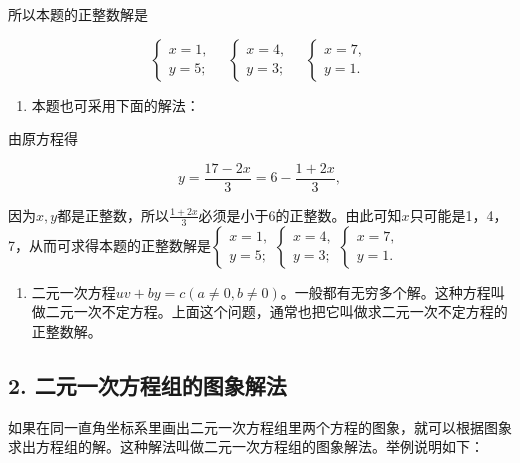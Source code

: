 所以本题的正整数解是

\[
\left\{ \begin{array}{l} x = 1, \\ y = 5; \end{array} \right. \quad \left\{ \begin{array}{l} x = 4, \\ y = 3; \end{array} \right. \quad \left\{ \begin{array}{l} x = 7, \\ y = 1. \end{array} \right.
\]


\begin{enumerate}
\item
  本题也可采用下面的解法：
\end{enumerate}

由原方程得

\[
y = \frac{17 - 2 x}{3} = 6 - \frac{1 + 2 x}{3},
\]

因为\(x, y\)都是正整数，所以\(\frac{1 + 2x}{3}\)必须是小于6的正整数。由此可知\(x\)只可能是1，4，7，从而可求得本题的正整数解是\(\left\{ \begin{array}{l} x = 1, \\ y = 5; \end{array} \right.\)\(\left\{ \begin{array}{l} x = 4, \\ y = 3; \end{array} \right.\)\(\left\{ \begin{array}{l} x = 7, \\ y = 1. \end{array} \right.\)

\begin{enumerate}[start=2]
\item
  二元一次方程\(uv + by = c (a \neq 0, b \neq 0)\)。一般都有无穷多个解。这种方程叫做二元一次不定方程。上面这个问题，通常也把它叫做求二元一次不定方程的正整数解。
\end{enumerate}

\subsection{2. 二元一次方程组的图象解法}

如果在同一直角坐标系里画出二元一次方程组里两个方程的图象，就可以根据图象求出方程组的解。这种解法叫做二元一次方程组的图象解法。举例说明如下：


